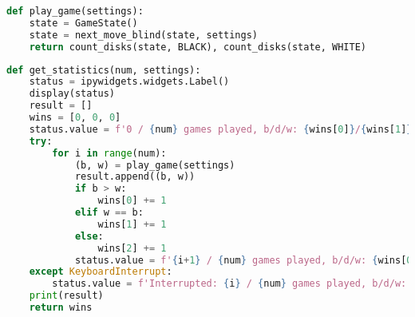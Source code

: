 \begin{lstlisting}[language=Python]
def play_game(settings):
    state = GameState()
    state = next_move_blind(state, settings)
    return count_disks(state, BLACK), count_disks(state, WHITE)
\end{lstlisting}

\begin{lstlisting}[language=Python]
def get_statistics(num, settings):
    status = ipywidgets.widgets.Label()
    display(status)
    result = []
    wins = [0, 0, 0]
    status.value = f'0 / {num} games played, b/d/w: {wins[0]}/{wins[1]}/{wins[2]}'
    try:
        for i in range(num):
            (b, w) = play_game(settings)
            result.append((b, w))
            if b > w:
                wins[0] += 1
            elif w == b:
                wins[1] += 1
            else:
                wins[2] += 1
            status.value = f'{i+1} / {num} games played, b/d/w: {wins[0]}/{wins[1]}/{wins[2]}'
    except KeyboardInterrupt:
        status.value = f'Interrupted: {i} / {num} games played, b/d/w: {wins[0]}/{wins[1]}/{wins[2]}'
    print(result)
    return wins
\end{lstlisting}
